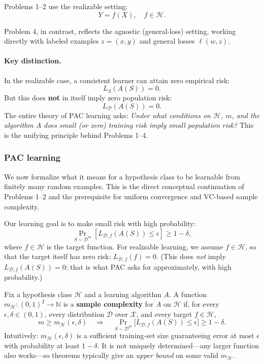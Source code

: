 \documentclass[11pt,a4paper]{article}
\theoremstyle{definition}
\begin{document}
Problems 1--2 use the realizable setting:
\[
Y = f(X), \quad f \in \mathcal{H}.
\]

Problem 4, in contrast, reflects the agnostic (general-loss) setting, working directly with labeled examples $z = (x, y)$ and general losses $\ell(w, z)$.

\paragraph{Key distinction.}
In the realizable case, a consistent learner can attain zero empirical risk:
\[
L_S(A(S)) = 0.
\]
But this does \textbf{not} in itself imply zero population risk:
\[
L_{\mathcal{D}}(A(S)) = 0.
\]
The entire theory of PAC learning asks: \emph{Under what conditions on $\mathcal{H}$, $m$, and the algorithm $A$ does small (or zero) training risk imply small population risk?} This is the unifying principle behind Problems 1--4.

\subsubsection{PAC learning}

We now formalize what it means for a hypothesis class to be learnable from finitely many random examples. This is the direct conceptual continuation of Problems 1–2 and the prerequisite for uniform convergence and VC-based sample complexity.

Our learning goal is to make small risk with high probability:
\[
\Pr_{S \sim \mathcal{D}^m} [L_{\mathcal{D},f}(A(S)) \leq \epsilon] \geq 1 - \delta,
\]
where \(f \in \mathcal{H}\) is the target function. For realizable learning, we assume \(f \in \mathcal{H}\), so that the target itself has zero risk: \(L_{\mathcal{D},f}(f) = 0\). (This does \emph{not} imply \(L_{\mathcal{D},f}(A(S)) = 0\); that is what PAC asks for approximately, with high probability.)

\begin{definition}
Fix a hypothesis class \(\mathcal{H}\) and a learning algorithm \(A\).
A function \(m_{\mathcal{H}} : (0,1)^2 \to \mathbb{N}\) is a \textbf{sample complexity} for \(A\) on \(\mathcal{H}\) if,
for every \(\epsilon, \delta \in (0,1)\), every distribution \(\mathcal{D}\) over \(\mathcal{X}\), and every target \(f \in \mathcal{H}\),
\[
m \geq m_{\mathcal{H}}(\epsilon, \delta)
\quad\Longrightarrow\quad
\Pr_{S \sim \mathcal{D}^m}\bigl[L_{\mathcal{D},f}(A(S)) \leq \epsilon\bigr] \geq 1 - \delta.
\]
Intuitively: \(m_{\mathcal{H}}(\epsilon,\delta)\) is a sufficient training-set size guaranteeing error at most \(\epsilon\) with probability at least \(1-\delta\).
It is not uniquely determined---any larger function also works---so theorems typically give an \emph{upper bound} on some valid \(m_{\mathcal{H}}\).
\end{definition}
\end{document}
